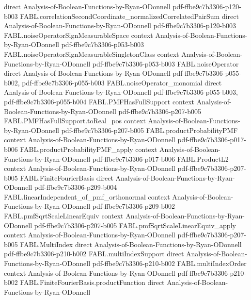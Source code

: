 \begin{theorem}
  {direct}
  {Analysis-of-Boolean-Functions-by-Ryan-ODonnell}
  {pdf-ffbe9c7b3306-p120-b003}
\proofstep
  {FABL.correlationSecondCoordinate_normalizedCorrelatedPairSum}
  {direct}
  {Analysis-of-Boolean-Functions-by-Ryan-ODonnell}
  {pdf-ffbe9c7b3306-p120-b003}
\proofstep
  {FABL.noiseOperatorSignMeasurableSpace}
  {context}
  {Analysis-of-Boolean-Functions-by-Ryan-ODonnell}
  {pdf-ffbe9c7b3306-p053-b003}
\proofstep
  {FABL.noiseOperatorSignMeasurableSingletonClass}
  {context}
  {Analysis-of-Boolean-Functions-by-Ryan-ODonnell}
  {pdf-ffbe9c7b3306-p053-b003}
\proofstep
  {FABL.noiseOperator}
  {direct}
  {Analysis-of-Boolean-Functions-by-Ryan-ODonnell}
  {pdf-ffbe9c7b3306-p055-b002,
    pdf-ffbe9c7b3306-p055-b003}
\proofstep
  {FABL.noiseOperator_monomial}
  {direct}
  {Analysis-of-Boolean-Functions-by-Ryan-ODonnell}
  {pdf-ffbe9c7b3306-p055-b003,
    pdf-ffbe9c7b3306-p055-b004}
\proofstep
  {FABL.PMFHasFullSupport}
  {context}
  {Analysis-of-Boolean-Functions-by-Ryan-ODonnell}
  {pdf-ffbe9c7b3306-p207-b005}
\proofstep
  {FABL.PMFHasFullSupport.toReal_pos}
  {context}
  {Analysis-of-Boolean-Functions-by-Ryan-ODonnell}
  {pdf-ffbe9c7b3306-p207-b005}
\proofstep
  {FABL.productProbabilityPMF}
  {context}
  {Analysis-of-Boolean-Functions-by-Ryan-ODonnell}
  {pdf-ffbe9c7b3306-p017-b006}
\proofstep
  {FABL.productProbabilityPMF_apply}
  {context}
  {Analysis-of-Boolean-Functions-by-Ryan-ODonnell}
  {pdf-ffbe9c7b3306-p017-b006}
\proofstep
  {FABL.ProductL2}
  {context}
  {Analysis-of-Boolean-Functions-by-Ryan-ODonnell}
  {pdf-ffbe9c7b3306-p207-b005}
\proofstep
  {FABL.FiniteFourierBasis}
  {direct}
  {Analysis-of-Boolean-Functions-by-Ryan-ODonnell}
  {pdf-ffbe9c7b3306-p209-b004}
\proofstep
  {FABL.linearIndependent_of_pmf_orthonormal}
  {context}
  {Analysis-of-Boolean-Functions-by-Ryan-ODonnell}
  {pdf-ffbe9c7b3306-p209-b002}
\proofstep
  {FABL.pmfSqrtScaleLinearEquiv}
  {context}
  {Analysis-of-Boolean-Functions-by-Ryan-ODonnell}
  {pdf-ffbe9c7b3306-p207-b005}
\proofstep
  {FABL.pmfSqrtScaleLinearEquiv_apply}
  {context}
  {Analysis-of-Boolean-Functions-by-Ryan-ODonnell}
  {pdf-ffbe9c7b3306-p207-b005}
\proofstep
  {FABL.MultiIndex}
  {direct}
  {Analysis-of-Boolean-Functions-by-Ryan-ODonnell}
  {pdf-ffbe9c7b3306-p210-b002}
\proofstep
  {FABL.multiIndexSupport}
  {direct}
  {Analysis-of-Boolean-Functions-by-Ryan-ODonnell}
  {pdf-ffbe9c7b3306-p210-b002}
\proofstep
  {FABL.multiIndexOrder}
  {context}
  {Analysis-of-Boolean-Functions-by-Ryan-ODonnell}
  {pdf-ffbe9c7b3306-p210-b002}
\proofstep
  {FABL.FiniteFourierBasis.productFunction}
  {direct}
  {Analysis-of-Boolean-Functions-by-Ryan-ODonnell}

\end{theorem}
